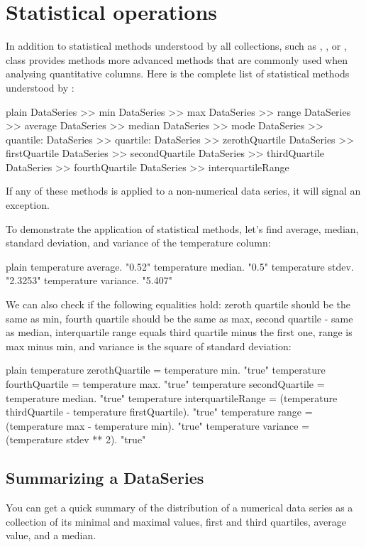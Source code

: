 \documentclass[10pt,twoside,english]{_support/latex/sbabook/sbabook}
\begin{document}
\section{Statistical operations}
In addition to statistical methods understood by all collections, such as , , or ,  class provides methods more advanced methods that are commonly used when analysing quantitative columns. Here is the complete list of statistical methods understood by :

\begin{displaycode}{plain}
DataSeries >> min
DataSeries >> max
DataSeries >> range
DataSeries >> average
DataSeries >> median
DataSeries >> mode
DataSeries >> quantile:
DataSeries >> quartile:
DataSeries >> zerothQuartile
DataSeries >> firstQuartile
DataSeries >> secondQuartile
DataSeries >> thirdQuartile
DataSeries >> fourthQuartile
DataSeries >> interquartileRange
\end{displaycode}

If any of these methods is applied to a non-numerical data series, it will signal an exception.

To demonstrate the application of statistical methods, let's find average, median, standard deviation, and variance of the temperature column:

\begin{displaycode}{plain}
temperature average. "0.52"
temperature median. "0.5"
temperature stdev. "2.3253"
temperature variance. "5.407"
\end{displaycode}

We can also check if the following equalities hold: zeroth quartile should be the same as min, fourth quartile should be the same as max, second quartile - same as median, interquartile range equals third quartile minus the first one, range is max minus min, and variance is the square of standard deviation:

\begin{displaycode}{plain}
temperature zerothQuartile = temperature min. "true"
temperature fourthQuartile = temperature max. "true"
temperature secondQuartile = temperature median. "true"
temperature interquartileRange = (temperature thirdQuartile - temperature firstQuartile). "true"
temperature range = (temperature max - temperature min). "true"
temperature variance = (temperature stdev ** 2). "true"
\end{displaycode}
\subsection{Summarizing a DataSeries}
You can get a quick summary of the distribution of a numerical data series as a collection of its minimal and maximal values, first and third quartiles, average value, and a median.
\end{document}
